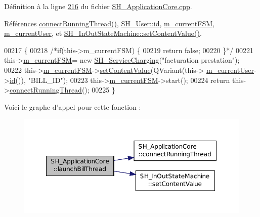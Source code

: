Définition à la ligne \hyperlink{SH__ApplicationCore_8cpp_source_l00216}{216} du fichier \hyperlink{SH__ApplicationCore_8cpp_source}{S\-H\-\_\-\-Application\-Core.\-cpp}.



Références \hyperlink{classSH__ApplicationCore_a3a10c2d662707140340d7a827d119c8d}{connect\-Running\-Thread()}, \hyperlink{classSH__User_ad6fb57220df359c4cd28fbd8fcc71b12}{S\-H\-\_\-\-User\-::id}, \hyperlink{classSH__ApplicationCore_a1088f3ba13abb8b3989cc0c325524232}{m\-\_\-current\-F\-S\-M}, \hyperlink{classSH__ApplicationCore_aa61720acee7e06e9828c570e8190304a}{m\-\_\-current\-User}, et \hyperlink{classSH__InOutStateMachine_aa2766b7a7ba39c35a10df7fc0c151b4f}{S\-H\-\_\-\-In\-Out\-State\-Machine\-::set\-Content\-Value()}.


\begin{DoxyCode}
00217 \{
00218     \textcolor{comment}{/*if(this->m\_currentFSM) \{}
00219 \textcolor{comment}{        return false;}
00220 \textcolor{comment}{    \}*/}
00221     this->\hyperlink{classSH__ApplicationCore_a1088f3ba13abb8b3989cc0c325524232}{m\_currentFSM}= \textcolor{keyword}{new} \hyperlink{classSH__ServiceCharging}{SH\_ServiceCharging}(\textcolor{stringliteral}{"facturation prestation"});
00222     this->\hyperlink{classSH__ApplicationCore_a1088f3ba13abb8b3989cc0c325524232}{m\_currentFSM}->\hyperlink{classSH__InOutStateMachine_aa2766b7a7ba39c35a10df7fc0c151b4f}{setContentValue}(QVariant(this->
      \hyperlink{classSH__ApplicationCore_aa61720acee7e06e9828c570e8190304a}{m\_currentUser}->\hyperlink{classSH__User_ad6fb57220df359c4cd28fbd8fcc71b12}{id}()), \textcolor{stringliteral}{"BILL\_ID"});
00223     this->\hyperlink{classSH__ApplicationCore_a1088f3ba13abb8b3989cc0c325524232}{m\_currentFSM}->start();
00224     \textcolor{keywordflow}{return} this->\hyperlink{classSH__ApplicationCore_a3a10c2d662707140340d7a827d119c8d}{connectRunningThread}();
00225 \}
\end{DoxyCode}


Voici le graphe d'appel pour cette fonction \-:\nopagebreak
\begin{figure}[H]
\begin{center}
\leavevmode
\includegraphics[width=350pt]{classSH__ApplicationCore_a17a048025bc51a96663029e58c722741_cgraph}
\end{center}
\end{figure}


